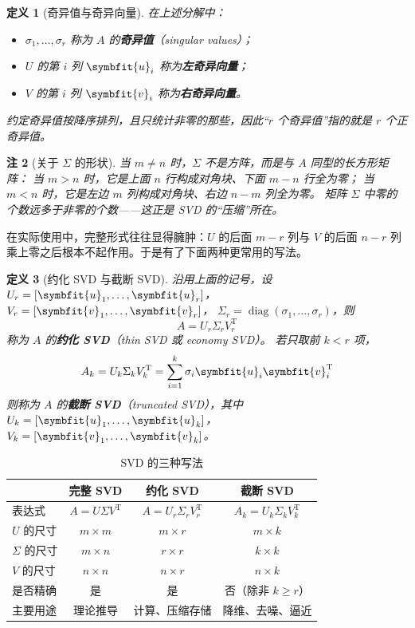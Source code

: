 \documentclass[UTF8, 11pt, a4paper, fontset=windows]{ctexart}
\theoremstyle{cnthm}
\theoremstyle{cndef}
\newtheorem{defn}{定义}[section]
\newtheorem{rem}[defn]{注}
\newcommand{\T}{^{\mathrm{T}}}
\DeclareMathOperator{\diag}{diag}
\newcommand{\bu}{\symbfit{u}}
\newcommand{\vv}{\symbfit{v}}
\begin{document}
\begin{defn}[奇异值与奇异向量]\label{def:sv}
在上述分解中：
\begin{itemize}
  \item $\sigma_1,\dots,\sigma_r$ 称为 $A$ 的\textbf{奇异值}（singular values）；
  \item $U$ 的第 $i$ 列 $\bu_i$ 称为\textbf{左奇异向量}；
  \item $V$ 的第 $i$ 列 $\vv_i$ 称为\textbf{右奇异向量}。
\end{itemize}
约定奇异值按降序排列，且只统计非零的那些，因此“$r$ 个奇异值”指的就是 $r$ 个正奇异值。
\end{defn}

\begin{rem}[关于 $\Sigma$ 的形状]
当 $m\neq n$ 时，$\Sigma$ 不是方阵，而是与 $A$ 同型的长方形矩阵：
当 $m>n$ 时，它是上面 $n$ 行构成对角块、下面 $m-n$ 行全为零；
当 $m<n$ 时，它是左边 $m$ 列构成对角块、右边 $n-m$ 列全为零。
矩阵 $\Sigma$ 中零的个数远多于非零的个数——这正是 SVD 的“压缩”所在。
\end{rem}

在实际使用中，完整形式往往显得臃肿：$U$ 的后面 $m-r$ 列与 $V$ 的后面 $n-r$ 列
乘上零之后根本不起作用。于是有了下面两种更常用的写法。

\begin{defn}[约化 SVD 与截断 SVD]\label{def:thin}
沿用上面的记号，设 $U_r=[\bu_1,\dots,\bu_r]$，$V_r=[\vv_1,\dots,\vv_r]$，
$\Sigma_r=\diag(\sigma_1,\dots,\sigma_r)$，则
\begin{equation}\label{eq:svd-thin}
  A=U_r\Sigma_r V_r\T
\end{equation}
称为 $A$ 的\textbf{约化 SVD}（thin SVD 或 economy SVD）。
若只取前 $k<r$ 项，
\begin{equation}\label{eq:svd-trunc}
  A_k=U_k\Sigma_k V_k\T=\sum_{i=1}^{k}\sigma_i\bu_i\vv_i\T
\end{equation}
则称为 $A$ 的\textbf{截断 SVD}（truncated SVD），其中
$U_k=[\bu_1,\dots,\bu_k]$，$V_k=[\vv_1,\dots,\vv_k]$。
\end{defn}

\begin{table}[htbp]
\centering
\small
\caption{SVD 的三种写法}\label{tab:three-forms}
\renewcommand{\arraystretch}{1.4}
\begin{tabular}{@{}lccc@{}}
\toprule
 & \textbf{完整 SVD} & \textbf{约化 SVD} & \textbf{截断 SVD} \\
\midrule
表达式 & $A=U\Sigma V\T$ & $A=U_r\Sigma_r V_r\T$ & $A_k=U_k\Sigma_k V_k\T$ \\
$U$ 的尺寸 & $m\times m$ & $m\times r$ & $m\times k$ \\
$\Sigma$ 的尺寸 & $m\times n$ & $r\times r$ & $k\times k$ \\
$V$ 的尺寸 & $n\times n$ & $n\times r$ & $n\times k$ \\
是否精确 & 是 & 是 & 否（除非 $k\ge r$） \\
主要用途 & 理论推导 & 计算、压缩存储 & 降维、去噪、逼近 \\
\bottomrule
\end{tabular}
\end{table}
\end{document}
